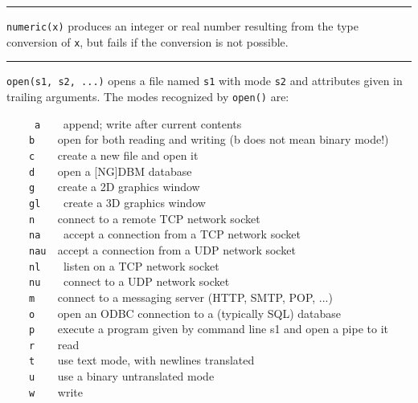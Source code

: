 \bigskip\hrule\vspace{0.1cm}

\noindent
{}\texttt{numeric(x)} produces an integer or real
number resulting from the type conversion of \texttt{x}, but fails if
the conversion is not possible.

\bigskip\hrule\vspace{0.1cm}

\noindent
{}\texttt{open(s1, s2, ...)} opens a file named
\texttt{s1} with mode \texttt{s2} and attributes given in trailing
arguments. The modes recognized by \texttt{open()} are: 

\ \ \ \ \ \texttt{{\textquotedbl}a{\textquotedbl}\ \ \ \ }append; write
after current contents\\
 \ \ \ \ \texttt{{\textquotedbl}b{\textquotedbl}\ \ \ \ }open for both
reading and writing (b does not mean binary mode!)\\
 \ \ \ \ \texttt{{\textquotedbl}c{\textquotedbl}\ \ \ \ }create a new
file and open it\\
 \ \ \ \ \texttt{{\textquotedbl}d{\textquotedbl}\ \ \ \ }open a
[NG]DBM database\\
 \ \ \ \ \texttt{{\textquotedbl}g{\textquotedbl}\ \ \ \ }create a 2D
graphics window\\
 \ \ \ \ \texttt{{\textquotedbl}gl{\textquotedbl}\ \ \ \ }create a 3D
graphics window\\
 \ \ \ \ \texttt{{\textquotedbl}n{\textquotedbl}\ \ \ \ }connect to a
remote TCP network socket\\
 \ \ \ \ \texttt{{\textquotedbl}na{\textquotedbl}\ \ \ \ }accept a
connection from a TCP network socket \\
 \ \ \ \ \texttt{{\textquotedbl}nau{\textquotedbl}\ \ }accept a
connection from a UDP network socket\\
 \ \ \ \ \texttt{{\textquotedbl}nl{\textquotedbl}\ \ \ \ }listen on a
TCP network socket \\
 \ \ \ \ \texttt{{\textquotedbl}nu{\textquotedbl}\ \ \ \ }connect to a
UDP network socket\\
 \ \ \ \ \texttt{{\textquotedbl}m{\textquotedbl}\ \ \ \ }connect to a
messaging server (HTTP, SMTP, POP, ...)\\
 \ \ \ \ \texttt{{\textquotedbl}o{\textquotedbl}\ \ \ \ }open an
ODBC connection to a (typically SQL)
database\\
 \ \ \ \ \texttt{{\textquotedbl}p{\textquotedbl}\ \ \ \ }execute a
program given by command line s1 and open a pipe to it\\
 \ \ \ \ \texttt{{\textquotedbl}r{\textquotedbl}\ \ \ \ }read\\
 \ \ \ \ \texttt{{\textquotedbl}t{\textquotedbl}\ \ \ \ }use text mode,
with newlines translated\\
 \ \ \ \ \texttt{{\textquotedbl}u{\textquotedbl}\ \ \ \ }use a binary
untranslated mode\\
 \ \ \ \ \texttt{{\textquotedbl}w{\textquotedbl}\ \ \ \ }write

